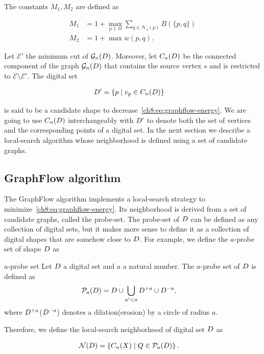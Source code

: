 The constants $M_1,M_2$ are defined as

\begin{align*}
M_1 &= 1 + \max_{p \in \Omega}{\sum_{q \in \mathcal{N}_4(p)}}{B(\{p,q\})} \\
M_2 &= 1 + \max w(p,q).
\end{align*}


Let $\mathcal{E}'$ the minimum cut of $\mathcal{G}_n(D)$. Moreover, let $C_n(D)$ be the connected component of the graph $\mathcal{G}_n(D)$ that contains the source vertex $s$ and is restricted to $\mathcal{E} \setminus \mathcal{E}'$. The digital set 

\begin{align*}
	D' &= \{ p \; | \; v_p \in C_n(D) \}
\end{align*}

is said to be a candidate shape to decrease~\cref{ch8:eq:graphflow-energy}. We are going to use $C_n(D)$ interchangeably with $D'$ to denote both the set of vertices and the corresponding points of a digital set. In the next section we describe a local-search algorithm whose neighborhood is defined using a set of candidate graphs.
 

\subsection{GraphFlow algorithm}
	The GraphFlow algorithm implements a local-search strategy to minimize~\cref{ch8:eq:graphflow-energy}. Its neighborhood is derived from a set of candidate graphs, called the probe-set. 	
	The probe-set of $D$ can be defined as any collection of digital sets, but it makes more sense to define it as a collection of digital shapes that are somehow close to $D$. For example, we define the $a$-probe set of shape $D$ as

\begin{definition}{$a$-probe set}
	Let $D$ a digital set and $a$ a natural number. The $a$-probe set of $D$ is defined as
	\begin{align*}
		\mathcal{P}_a(D) &= D \cup \bigcup_{a' < a}{D^{+a} \cup D^{-a}},
	\end{align*}
	where $D^{+a}$($D^{-a}$) denotes a dilation(erosion) by a circle of radius $a$.
\end{definition}

Therefore, we define the local-search neighborhood of digital set $D$ as

\begin{align*}
	\mathcal{N}(D) &= \left \{ C_n(X) \; | \; Q \in \mathcal{P}_a(D) \right\}.
\end{align*}

